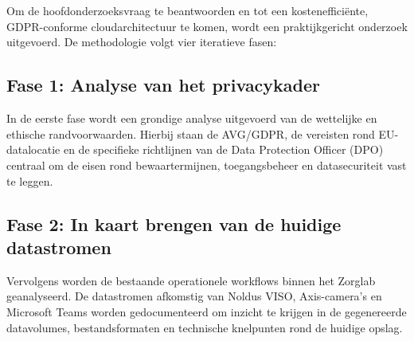 
\chapter{}%
\label{ch:methodologie}


Om de hoofdonderzoeksvraag te beantwoorden en tot een kostenefficiënte, GDPR-conforme cloudarchitectuur te komen, wordt een praktijkgericht onderzoek uitgevoerd. De methodologie volgt vier iteratieve fasen:

\section{Fase 1: Analyse van het privacykader}
In de eerste fase wordt een grondige analyse uitgevoerd van de wettelijke en ethische randvoorwaarden. Hierbij staan de AVG/GDPR, de vereisten rond EU-datalocatie en de specifieke richtlijnen van de Data Protection Officer (DPO) centraal om de eisen rond bewaartermijnen, toegangsbeheer en datasecuriteit vast te leggen.

\section{Fase 2: In kaart brengen van de huidige datastromen}
Vervolgens worden de bestaande operationele workflows binnen het Zorglab geanalyseerd. De datastromen afkomstig van Noldus VISO, Axis-camera's en Microsoft Teams worden gedocumenteerd om inzicht te krijgen in de gegenereerde datavolumes, bestandsformaten en technische knelpunten rond de huidige opslag.

